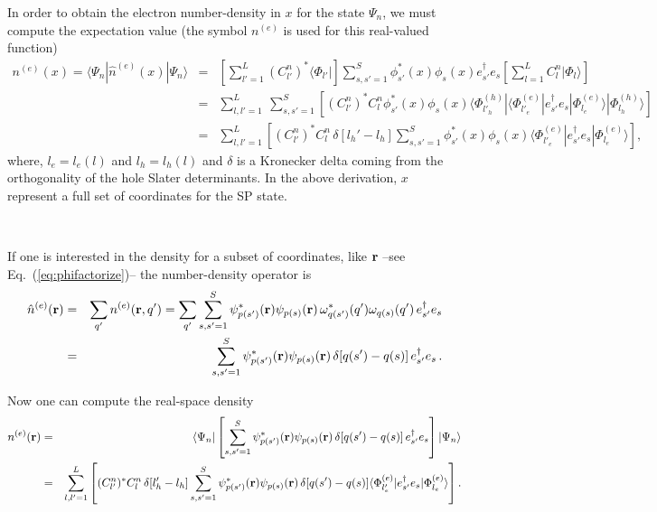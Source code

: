 \documentclass[12pt,twoside]{article}
\begin{document}
In order to obtain the electron number-density in $x$
for the state $\Psi_n$, we must compute the expectation value 
(the symbol $n^{(e)}$ is used for
this real-valued function)
\begin{eqnarray} \label{nx}
n^{(e)}(x)=
\langle \Psi_n | \hat n^{(e)}(x) | \Psi_n \rangle 
&=& 
\left[  \sum_{l'=1}^L  (C^n_{l'})^*  \langle\Phi_{l'} | \right]
 \sum_{s, s' = 1}^S \phi^*_{s'}(x) \phi_{s}(x) e^\dagger_{s'} e_{s}
\left[  \sum_{l=1}^L  C^n_l  |\Phi_l\rangle \right ]     \nonumber
\\
&=& 
\sum_{l, l' = 1}^L \ \sum_{s, s' = 1}^S 
\left[ (C^n_{l'})^* C^n_l \phi^*_{s'}(x) \phi_{s}(x)
\langle\Phi^{(h)}_{l'_h}| \langle\Phi^{(e)}_{l'_e}|
e^\dagger_{s'} e_{s} 
|\Phi^{(e)}_{l_e}\rangle |\Phi^{(h)}_{l_h}\rangle 
 \right ]    \nonumber
\\
&=& 
\sum_{l, l' = 1}^L  \left[ 
(C^n_{l'})^* C^n_l \, \delta[l_h'-l_h] \sum_{s, s' = 1}^S 
\phi^*_{s'}(x) \phi_{s}(x)
\langle\Phi^{(e)}_{l'_e}| e^\dagger_{s'} e_{s} 
|\Phi^{(e)}_{l_e}\rangle  \right ] ,   \nonumber
\end{eqnarray}
where, $l_e={l_e(l)}$ and $l_h={l_h(l)}$ and $\delta$ is a Kronecker
delta coming from the orthogonality of the hole Slater determinants.
In the above derivation, $x$ represent a full set of coordinates for
the SP state.

\

If one is interested in the density for a subset of coordinates,
like ${\bf r}$ --see Eq.~(\ref{eq:phifactorize})-- the number-density
operator is
\begin{eqnarray} \label{numberdensityop_r}
\hat n^{(e)}({\bf r}) &=& \sum_{q'} n^{(e)}({\bf r},q') = 
\sum_{q'} \sum_{s, s' =1}^S \psi^*_{p(s')}({\bf r}) \psi_{p(s)}({\bf r}) 
\, \omega^*_{q(s')}(q') \omega_{q(s)}(q')  \, 
e^\dagger_{s'} e_{s} 
\\  \nonumber
&=& \sum_{s, s' =1}^S \psi^*_{p(s')}({\bf r}) \psi_{p(s)}({\bf r}) 
\, \delta[q(s')-q(s)]  \, 
e^\dagger_{s'} e_{s} \, .
\end{eqnarray}

Now one can compute the real-space density
\begin{eqnarray} \label{numberdensity_r}
n^{(e)}({\bf r}) &=&\langle \Psi_n | 
\left[ \sum_{s, s' =1}^S \psi^*_{p(s')}({\bf r}) \psi_{p(s)}({\bf r}) 
\, \delta[q(s')-q(s)]  \, e^\dagger_{s'} e_{s} \right] | \Psi_n \rangle
\\  \nonumber
&=&  \sum_{l, l' = 1}^L  \left[ 
(C^n_{l'})^* C^n_l \, \delta[l_h'-l_h] \sum_{s, s' = 1}^S 
\psi^*_{p(s')}({\bf r}) \psi_{p(s)}({\bf r}) 
\, \delta[q(s')-q(s)]
\langle\Phi^{(e)}_{l'_e}| e^\dagger_{s'} e_{s} 
|\Phi^{(e)}_{l_e}\rangle  \right ] .
\end{eqnarray}
\end{document}
